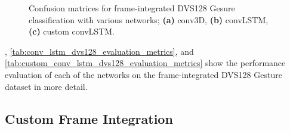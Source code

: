 \begin{figure}[htb]%
    \centering
    \qquad
    \qquad
    \caption{Confusion matrices for frame-integrated  DVS128 Gesure classification with various networks; \textbf{(a)} conv3D, \textbf{(b)} convLSTM, \textbf{(c)} custom convLSTM.}%
    \label{fig:dvs128_c_matrices}%
\end{figure}

, \cref{tab:conv_lstm_dvs128_evaluation_metrics}, and \cref{tab:custom_conv_lstm_dvs128_evaluation_metrics} show the performance evaluation of each of the networks on the frame-integrated DVS128 Gesture dataset in more detail.

\subsection{Custom Frame Integration}

